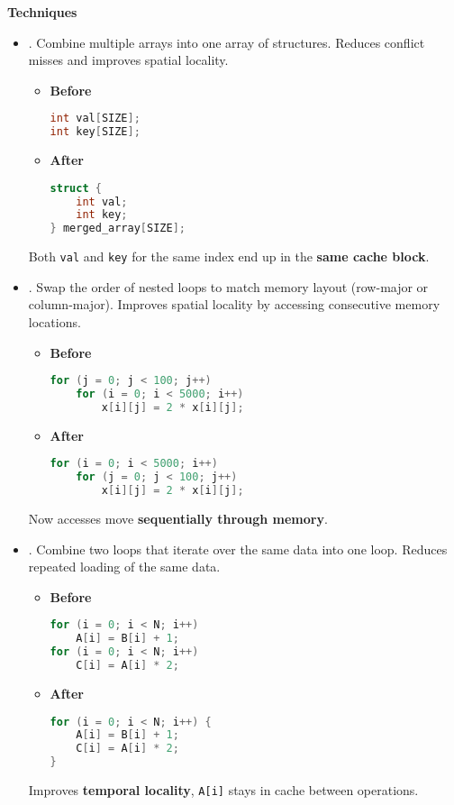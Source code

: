 \highspace
\begin{flushleft}
    \textcolor{Green3}{ \textbf{Techniques}}
\end{flushleft}
\begin{itemize}
    \item {}. Combine multiple arrays into one array of structures. Reduces conflict misses and improves spatial locality.
    \begin{itemize}
        \item \textbf{Before}
        \begin{lstlisting}[language=c]
int val[SIZE];
int key[SIZE];\end{lstlisting}
        \item \textbf{After}
        \begin{lstlisting}[language=c]
struct {
    int val;
    int key;
} merged_array[SIZE];\end{lstlisting}
    \end{itemize}
    Both \texttt{val} and \texttt{key} for the same index end up in the \textbf{same cache block}.

    \item {}. Swap the order of nested loops to match memory layout (row-major or column-major). Improves spatial locality by accessing consecutive memory locations.
    \begin{itemize}
        \item \textbf{Before}
        \begin{lstlisting}[language=c]
for (j = 0; j < 100; j++)
    for (i = 0; i < 5000; i++)
        x[i][j] = 2 * x[i][j];\end{lstlisting}
        \item \textbf{After}
        \begin{lstlisting}[language=c]
for (i = 0; i < 5000; i++)
    for (j = 0; j < 100; j++)
        x[i][j] = 2 * x[i][j];\end{lstlisting}
    \end{itemize}
    Now accesses move \textbf{sequentially through memory}.

    \item {}. Combine two loops that iterate over the same data into one loop. Reduces repeated loading of the same data.
    \begin{itemize}
        \item \textbf{Before}
        \begin{lstlisting}[language=c]
for (i = 0; i < N; i++)
    A[i] = B[i] + 1;
for (i = 0; i < N; i++)
    C[i] = A[i] * 2;\end{lstlisting}
        \item \textbf{After}
        \begin{lstlisting}[language=c]
for (i = 0; i < N; i++) {
    A[i] = B[i] + 1;
    C[i] = A[i] * 2;
}\end{lstlisting}
    \end{itemize}
    Improves \textbf{temporal locality}, \texttt{A[i]} stays in cache between operations.


\end{itemize}
